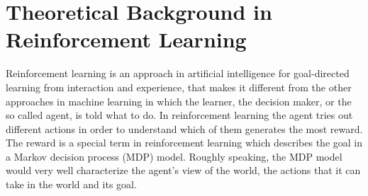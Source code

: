 \section{Theoretical Background in Reinforcement Learning}
Reinforcement learning is an approach in artificial intelligence for goal-directed learning from interaction and experience, that makes it different from the other approaches in machine learning in which the learner, the decision maker, or the so called agent, is told what to do. In reinforcement learning the agent tries out different actions in order to understand which of them generates the most reward. The reward is a special term in reinforcement learning which describes the goal in a Markov decision process (MDP) model. Roughly speaking, the MDP model would very well characterize the agent’s view of the world, the actions that it can take in the world and its goal.

